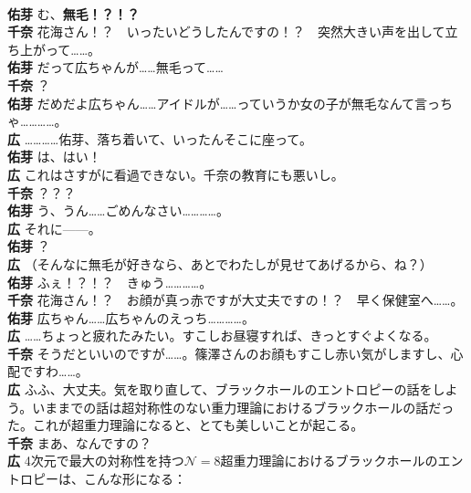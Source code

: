 \documentclass[paper=b5j,fontsize=12Q,jafontsize=12Q,baselineskip=21Q]{jlreq}
\DeclareRobustCommand{\hiron}{\textbf{広 }}
\DeclareRobustCommand{\chinan}{\textbf{千奈 }}
\DeclareRobustCommand{\umen}{\textbf{佑芽 }}
\begin{document}
\begin{refsection}
\\\umen む、\textbf{無毛！？！？}
\\\chinan 花海さん！？　いったいどうしたんですの！？　突然大きい声を出して立ち上がって……。
\\\umen だって広ちゃんが……無毛って……
\\\chinan ？
\\\umen だめだよ広ちゃん……アイドルが……っていうか女の子が無毛なんて言っちゃ…………。
\\\hiron …………佑芽、落ち着いて、いったんそこに座って。
\\\umen は、はい！
\\\hiron これはさすがに看過できない。千奈の教育にも悪いし。
\\\chinan ？？？
\\\umen う、うん……ごめんなさい…………。
\\\hiron それに------。
\\\umen ？
\\\hiron （そんなに無毛が好きなら、あとでわたしが見せてあげるから、ね？）
\\\umen ふぇ！？！？　きゅう…………。
\\\chinan 花海さん！？　お顔が真っ赤ですが大丈夫ですの！？　早く保健室へ……。
\\\umen 広ちゃん……広ちゃんのえっち…………。
\\\hiron ……ちょっと疲れたみたい。すこしお昼寝すれば、きっとすぐよくなる。
\\\chinan そうだといいのですが……。篠澤さんのお顔もすこし赤い気がしますし、心配ですわ……。
\\\hiron ふふ、大丈夫。気を取り直して、ブラックホールのエントロピーの話をしよう。いままでの話は超対称性のない重力理論におけるブラックホールの話だった。これが超重力理論になると、とても美しいことが起こる。
\\\chinan まあ、なんですの？
\\\hiron 4次元で最大の対称性を持つ$\mathcal N=8$超重力理論におけるブラックホールのエントロピーは、こんな形になる：


\end{refsection}
\end{document}
